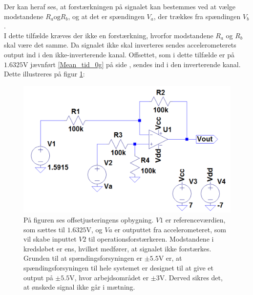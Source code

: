 \noindent Der kan heraf ses, at forstærkningen på signalet kan bestemmes ved at vælge modstandene $R_a \text{og} R_b$, og at det er spændingen $V_{a}$, der trækkes fra spændingen $V_{b}$. \\
I dette tilfælde kræves der ikke en forstærkning, hvorfor modstandene $R_{a}$ og $R_{b}$ skal være det samme. Da signalet ikke skal inverteres sendes accelerometerets output ind i den ikke-inverterende kanal. Offsettet, som i dette tilfælde er på $1.6325$V jævnført \ref{Mean_tid_0g} på side \pageref{Mean_tid_0g}, sendes ind i den inverterende kanal. Dette illustreres på figur \ref{fig:Offset_generisk}:
\begin{figure}[H]
\centering
\includegraphics[scale=0.45]{figures/cProblemloesning/Offset_generisk.png}
\caption{På figuren ses offsetjusteringens opbygning. $V1$ er referenceværdien, som sættes til $1.6325$V, og $Va$ er outputtet fra accelerometeret, som vil skabe inputtet $V2$ til operationsforstærkeren. Modstandene i kredsløbet er ens, hvilket medfører, at signalet ikke forstærkes. Grunden til at spændingsforsyningen er $\pm5.5$V er, at spændingsforsyningen til hele systemet er designet til at give et output på $\pm5.5$V, hvor arbejdsområdet er $\pm3$V. Derved sikres det, at ønskede signal ikke går i mætning.}
\label{fig:Offset_generisk}
\end{figure}

